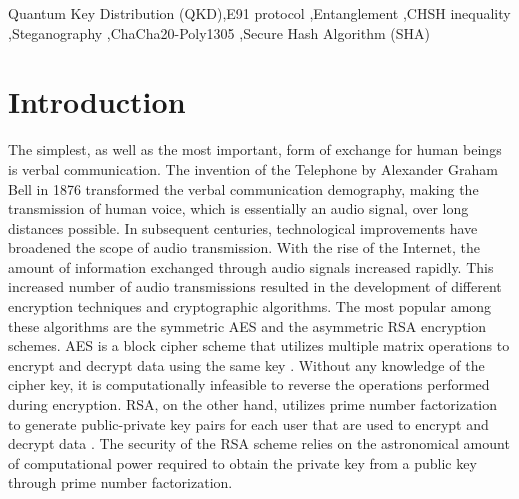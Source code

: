 \documentclass[a4paper]{cas-sc}
\begin{document}
\begin{keywords}
    Quantum Key Distribution (QKD)\sep E91 protocol \sep Entanglement \sep CHSH inequality \sep Steganography \sep ChaCha20-Poly1305 \sep Secure Hash Algorithm (SHA)
\end{keywords}

\maketitle

\section{Introduction}
The simplest, as well as the most important, form of exchange for human beings is verbal communication. The invention of the Telephone by Alexander Graham Bell in 1876 transformed the verbal communication demography, making the transmission of human voice, which is essentially an audio signal, over long distances possible. In subsequent centuries, technological improvements have broadened the scope of audio transmission. With the rise of the Internet, the amount of information exchanged through audio signals increased rapidly. This increased number of audio transmissions resulted in the development of different encryption techniques and cryptographic algorithms. The most popular among these algorithms are the symmetric AES and the asymmetric RSA encryption schemes. AES is a block cipher scheme that utilizes multiple matrix operations to encrypt and decrypt data using the same key \cite{rijmen2001advanced}. Without any knowledge of the cipher key, it is computationally infeasible to reverse the operations performed during encryption. RSA, on the other hand, utilizes prime number factorization to generate public-private key pairs for each user that are used to encrypt and decrypt data \cite{rivest1978method}. The security of the RSA scheme relies on the astronomical amount of computational power required to obtain the private key from a public key through prime number factorization.
\end{document}

